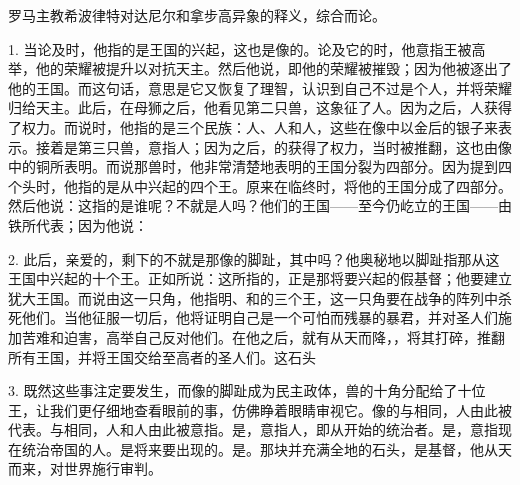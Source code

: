罗马主教希波律特对达尼尔和拿步高异象的释义，综合而论。\par

1. 当论及时，他指的是王国的兴起，这也是像的。论及它的时，他意指王被高举，他的荣耀被提升以对抗天主。然后他说，即他的荣耀被摧毁；因为他被逐出了他的王国。而这句话，意思是它又恢复了理智，认识到自己不过是个人，并将荣耀归给天主。此后，在母狮之后，他看见第二只兽，这象征了人。因为之后，人获得了权力。而说时，他指的是三个民族：人、人和人，这些在像中以金后的银子来表示。接着是第三只兽，意指人；因为之后，的获得了权力，当时被推翻，这也由像中的铜所表明。而说那兽时，他非常清楚地表明的王国分裂为四部分。因为提到四个头时，他指的是从中兴起的四个王。原来在临终时，将他的王国分成了四部分。然后他说：这指的是谁呢？不就是人吗？他们的王国——至今仍屹立的王国——由铁所代表；因为他说：\par

2. 此后，亲爱的，剩下的不就是那像的脚趾，其中吗？他奥秘地以脚趾指那从这王国中兴起的十个王。正如所说：这所指的，正是那将要兴起的假基督；他要建立犹大王国。而说由这一只角，他指明、和的三个王，这一只角要在战争的阵列中杀死他们。当他征服一切后，他将证明自己是一个可怕而残暴的暴君，并对圣人们施加苦难和迫害，高举自己反对他们。在他之后，就有从天而降，，将其打碎，推翻所有王国，并将王国交给至高者的圣人们。这石头\par

3. 既然这些事注定要发生，而像的脚趾成为民主政体，兽的十角分配给了十位王，让我们更仔细地查看眼前的事，仿佛睁着眼睛审视它。像的与相同，人由此被代表。与相同，人和人由此被意指。是，意指人，即从开始的统治者。是，意指现在统治帝国的人。是将来要出现的。是。那块并充满全地的石头，是基督，他从天而来，对世界施行审判。\par

